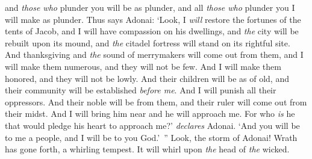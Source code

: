 \begin{biblechapter}
and \textit{those who} plunder you will be as plunder, 
and all \textit{those who} plunder you I will make as plunder.
\verse Thus says Adonai:
\verse ‘Look, I \textit{will} restore the fortunes of the tents of Jacob, 
and I will have compassion on his dwellings, 
and \textit{the} city will be rebuilt upon its mound, 
and \textit{the} citadel fortress will stand on its rightful site.
\verse And thanksgiving and \textit{the} sound of merrymakers 
will come out from them, 
and I will make them numerous, 
and they will not be few. 
And I will make them honored, 
and they will not be lowly.
\verse And their children will be as of old, 
and their community will be established \textit{before me}. 
And I will punish all their oppressors.
\verse And their noble will be from them, 
and their ruler will come out from their midst. 
And I will bring him near and he will approach me. 
For who \textit{is} he that would pledge his heart to approach me?’ \textit{declares} Adonai.
\verse ‘And you will be to me a people, 
and I will be to you God.’ ”
\verse Look, the storm of Adonai! 
Wrath has gone forth, 
a whirling tempest. 
It will whirl upon \textit{the} head of \textit{the} wicked.
\end{biblechapter}

